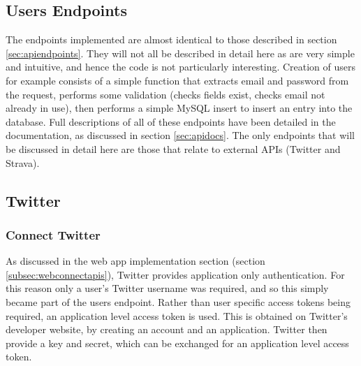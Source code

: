 \documentclass[11pt,openright,a4paper]{report}
\begin{document}
\subsection{Users Endpoints} \label{sec:apiimplusers}
The endpoints implemented are almost identical to those described in section \ref{sec:apiendpoints}. They will not all be described in detail here as are very simple and intuitive, and hence the code is not particularly interesting. Creation of users for example consists of a simple function that extracts email and password from the request, performs some validation (checks fields exist, checks email not already in use), then performs a simple MySQL insert to insert an entry into the database. Full descriptions of all of these endpoints have been detailed in the documentation, as discussed in section \ref{sec:apidocs}. The only endpoints that will be discussed in detail here are those that relate to external APIs (Twitter and Strava).

\subsection{Twitter} \label{sec:apiconnecttwitter}
\subsubsection{Connect Twitter}
As discussed in the web app implementation section (section \ref{subsec:webconnectapis}), Twitter provides application only authentication. For this reason only a user's Twitter username was required, and so this simply became part of the users endpoint. Rather than user specific access tokens being required, an application level access token is used. This is obtained on Twitter's developer website, by creating an account and an application. Twitter then provide a key and secret, which can be exchanged for an application level access token.
\end{document}

